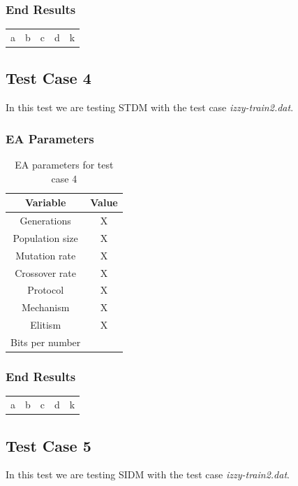 \subsubsection{End Results}\label{sec:test-case-3-results}
\begin{table}
	\begin{tabular}{c c c c c}
		a & b & c & d & k \\
	\end{tabular}
\end{table}

\subsection{Test Case 4}\label{sec:test-case-4}
In this test we are testing STDM with the test case
\textit{izzy-train2.dat}.
\subsubsection{EA Parameters}\label{sec:test-case-4-parameters}
\begin{table}
	\begin{tabular}{c c}
		Variable & Value \\
		\hline
		Generations & X \\
		\hline
		Population size & X \\
		\hline
		Mutation rate & X \\
		\hline
		Crossover rate & X \\
		\hline
		Protocol & X \\
		\hline
		Mechanism & X \\
		\hline
		Elitism & X \\
		\hline
		Bits per number & \\
	\end{tabular}
	\caption{EA parameters for test case 4}
\end{table}
\subsubsection{End Results}\label{sec:test-case-4-results}
\begin{table}
	\begin{tabular}{c c c c c}
		a & b & c & d & k \\
	\end{tabular}
\end{table}

\subsection{Test Case 5}\label{sec:test-case-5}
In this test we are testing SIDM with the test case
\textit{izzy-train2.dat}.

